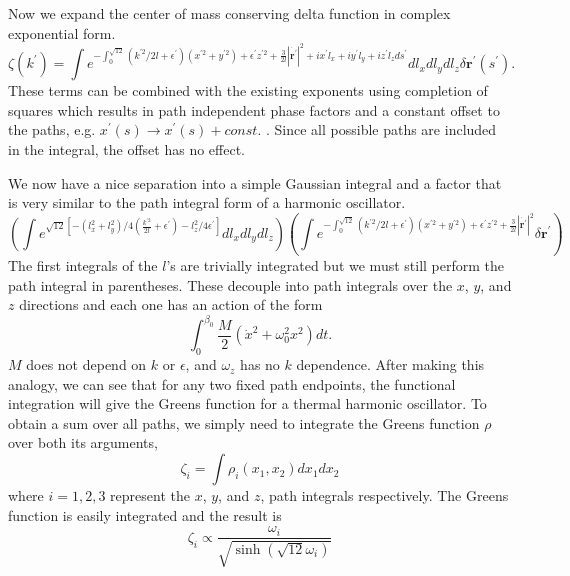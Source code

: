 \documentclass[pre,showpacs]{revtex4}
\begin{document}
Now we expand the center of mass conserving delta function in complex exponential form.
\begin{equation}
\zeta(k^\prime)= \int e^{-\int_0^{\sqrt{12}} (k^{\prime2}/2l + \epsilon^\prime)(x^{\prime2} + y^{\prime2} ) + \epsilon^\prime z^{\prime2}  + \frac{3}{2l} |\dot{\mathbf{r}^\prime}|^2 + i x^\prime l_x + i y^\prime l_y + i z^\prime l_z ds^\prime}  dl_xdl_ydl_z \delta \mathbf{r^\prime}(s^\prime) .
\end{equation}
These terms can be combined with the existing exponents using completion of squares which results in path independent phase factors and a constant offset to the paths, e.g. $x^\prime (s) \to x^\prime (s) + const.$ . Since all possible paths are included in the integral, the offset has no effect.

We now have a nice separation into a simple Gaussian integral and a factor that is very similar to the path integral form of a harmonic oscillator. 
\begin{equation}
(\int e^{\sqrt{12}[ -(l_x^2 + l_y^2)/4(\frac{k^{\prime2}}{2l} +\epsilon^\prime) - l_z^2/4\epsilon^\prime]}dl_xdl_ydl_z)  (\int e^{-\int_0^{\sqrt{12}} (k^{\prime2}/2l + \epsilon^\prime)(x^{\prime2} + y^{\prime2} ) + \epsilon^\prime z^{\prime2}  + \frac{3}{2l} |\dot{\mathbf{r}^\prime}|^2 } \delta \mathbf{r}^\prime)
\end{equation}
The first integrals of the $l$'s are trivially integrated but we must still perform the path integral in parentheses. 
These decouple into path integrals over the $x$, $y$, and $z$ directions and each one has an action of the form
\begin{equation}
\int_0^{\beta_0} \frac{M}{2}(\dot{x}^2 + \omega_0^2 x^2)dt .
\end{equation}
$M$ does not depend on $k$ or $\epsilon$, and $\omega_z$ has no $k$ dependence.
After making this analogy, we can see that for any two fixed path endpoints, the functional integration will give the Greens function for a thermal harmonic oscillator. To obtain a sum over all paths, we simply need to integrate the Greens function $\rho$ ~\cite{feynman} over both its arguments,
\begin{equation}
\zeta_i = \int \rho_i(x_1,x_2)dx_1dx_2
\end{equation}
where $i = 1,2,3$ represent the $x$, $y$, and $z$, path integrals respectively.
The Greens function is easily integrated and the result is 
\begin{equation}\label{eqn:zomega}
\zeta_i \propto \frac{\omega_i}{\sqrt{ \sinh{(\sqrt{12}\omega_i)}}}
\end{equation}
\end{document}
